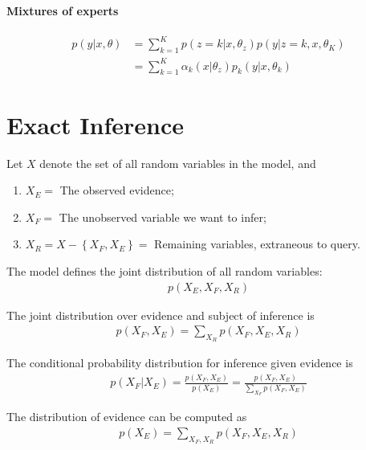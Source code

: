\documentclass{article}
\begin{document}
	\paragraph{Mixtures of experts}
	\begin{align}
		p(y | x, \theta) &= \sum_{k=1}^{K} p\left(z=k | x, \theta_{z}\right) p\left(y | z=k, x, \theta_{K}\right) \\
		&=\sum_{k=1}^K \alpha_{k}\left(x | \theta_{z}\right) p_{k}\left(y | x, \theta_{k}\right)
	\end{align}
	
	\section{Exact Inference}
	\begin{notation}
		Let $X$ denote the set of all random variables in the model, and
		\begin{enumerate}
			\item $X_{E}=$ The observed evidence;
			\item $X_{F}=$ The unobserved variable we want to infer;
			\item $X_{R}=X-\left\{X_{F}, X_{E}\right\}=$ Remaining variables, extraneous to query.
		\end{enumerate}
		The model defines the joint distribution of all random variables:
		\begin{align}
			p(X_E, X_F, X_R)
		\end{align}
	\end{notation}
	
	\begin{definition}
		The joint distribution over evidence and subject of inference is
		\begin{align}
			p\left(X_{F}, X_{E}\right)=\sum_{X_{R}} p\left(X_{F}, X_{E}, X_{R}\right)
		\end{align}
	\end{definition}
	
	\begin{definition}
		The conditional probability distribution for inference given evidence is
		\begin{align}
			p\left(X_{F} | X_{E}\right)=\frac{p\left(X_{F}, X_{E}\right)}{p\left(X_{E}\right)}=\frac{p\left(X_{F}, X_{E}\right)}{\sum_{X_{F}} p\left(X_{F}, X_{E}\right)}
		\end{align}
	\end{definition}
	
	\begin{definition}
		The distribution of evidence can be computed as
		\begin{align}
			p\left(X_{E}\right)=\sum_{X_{F}, X_{R}} p\left(X_{F}, X_{E}, X_{R}\right)
		\end{align}
	\end{definition}
	
\end{document}
